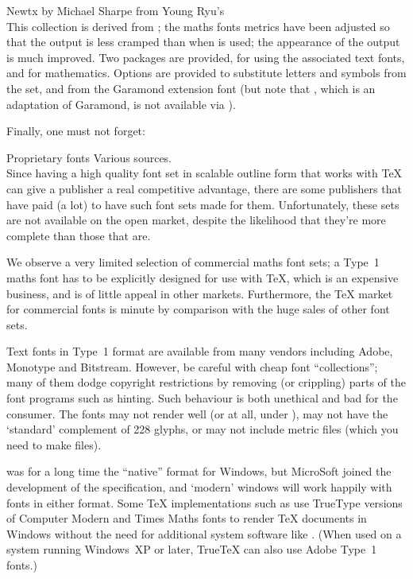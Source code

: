 \begin{booklist}
\item[Newtx]by Michael Sharpe from Young Ryu's \\
  This collection is derived from ; the maths fonts
  metrics have been adjusted so that the output is less cramped than
  when  is used; the appearance of the output is
  much improved.  Two packages are provided,  for
  using the associated text fonts, and  for
  mathematics.  Options are provided to substitute
  letters and symbols from the  set, and from the
  Garamond extension font  (but note that
  , which is an adaptation of  Garamond,
  is not available via \texlive{}).
\end{booklist}
Finally, one must not forget:
\begin{booklist}
\item[Proprietary fonts]Various sources.\\
  Since having a high quality font set in scalable outline form that
  works with \TeX{} can give a publisher a real competitive advantage,
  there are some publishers that have paid (a lot) to have such font
  sets made for them.  Unfortunately, these sets are not available on
  the open market, despite the likelihood that they're more complete
  than those that are.
\end{booklist}
We observe a very limited selection of commercial maths font sets; a
Type~1 maths font has to be explicitly designed for use with \TeX{},
which is an expensive business, and is of little appeal in other
markets.  Furthermore, the \TeX{} market for commercial fonts is
minute by comparison with the huge sales of other font sets.

Text fonts in Type~1 format are available from many vendors including
Adobe, Monotype and Bitstream.  However, be careful with cheap font
``collections''; many of them dodge copyright restrictions by removing
(or crippling) parts of the font programs such as hinting.  Such
behaviour is both unethical and bad for the consumer.
The fonts may not render well (or at all, under ), may not have the
`standard' complement of 228 glyphs, or may not include metric files
(which you need to make  files).

\ttype{} was for a long time the ``native'' format for Windows, but
MicroSoft joined the development of the \otype{} specification, and
`modern' windows will work happily with fonts in either format.  Some \TeX{}
implementations such as  use TrueType
versions of Computer Modern and Times Maths fonts to render \TeX{}
documents in Windows without the need for additional system software like
.  (When used on a system running Windows~XP or later,
True\TeX{} can also use Adobe Type~1 fonts.)


